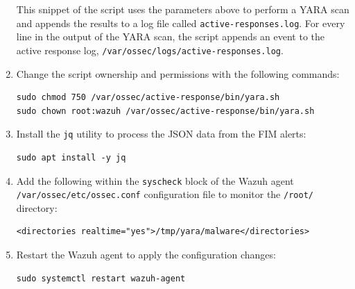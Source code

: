 \begin{enumerate}
This snippet of the script uses the parameters above to perform a YARA scan and appends the results to a log file called \texttt{active-responses.log}. For every line in the output of the YARA scan, the script appends an event to the active response log, \texttt{/var/ossec/logs/active-responses.log}.
    \item Change the script ownership and permissions with the following commands:
    \begin{verbatim}
sudo chmod 750 /var/ossec/active-response/bin/yara.sh
sudo chown root:wazuh /var/ossec/active-response/bin/yara.sh
    \end{verbatim}

    \item Install the \texttt{jq} utility to process the JSON data from the FIM alerts:
    \begin{verbatim}
sudo apt install -y jq
    \end{verbatim}

    \item Add the following within the \texttt{\textlangle syscheck\textrangle} block of the Wazuh agent \texttt{/var/ossec/etc/ossec.conf} configuration file to monitor the \texttt{/root/} directory:
    \begin{verbatim}
<directories realtime="yes">/tmp/yara/malware</directories>
    \end{verbatim}

    \item Restart the Wazuh agent to apply the configuration changes:
    \begin{verbatim}
sudo systemctl restart wazuh-agent
    \end{verbatim}
\end{enumerate}

